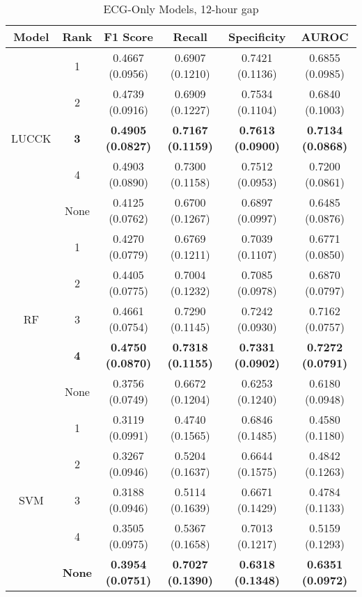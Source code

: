 \begin{table}
    \centering
    \caption{ECG-Only Models, 12-hour gap}
    \begin{tabular}{|c|c|c|c|c|c|}
        \hline
        Model & Rank & F1 Score & Recall & Specificity & AUROC \\
        \hline
         & 1 & 0.4667 (0.0956) & 0.6907 (0.1210) & 0.7421 (0.1136) & 0.6855 (0.0985)\\
         & 2 & 0.4739 (0.0916) & 0.6909 (0.1227) & 0.7534 (0.1104) & 0.6840 (0.1003)\\
        LUCCK & \textbf{3} & \textbf{0.4905 (0.0827)} & \textbf{0.7167 (0.1159)} & \textbf{0.7613 (0.0900)} & \textbf{0.7134 (0.0868)}\\
         & 4 & 0.4903 (0.0890) & 0.7300 (0.1158) & 0.7512 (0.0953) & 0.7200 (0.0861)\\
         & None & 0.4125 (0.0762) & 0.6700 (0.1267) & 0.6897 (0.0997) & 0.6485 (0.0876)\\
        \hline
        & 1 &  0.4270 (0.0779) & 0.6769 (0.1211) & 0.7039 (0.1107) & 0.6771 (0.0850)\\
         & 2 & 0.4405 (0.0775) & 0.7004 (0.1232) & 0.7085 (0.0978) & 0.6870 (0.0797)\\
        RF & 3 & 0.4661 (0.0754) & 0.7290 (0.1145) & 0.7242 (0.0930) & 0.7162 (0.0757)\\
         & \textbf{4} & \textbf{0.4750 (0.0870)} & \textbf{0.7318 (0.1155)} & \textbf{0.7331 (0.0902)} & \textbf{0.7272 (0.0791)}\\
         & None & 0.3756 (0.0749) & 0.6672 (0.1204) & 0.6253 (0.1240) & 0.6180 (0.0948)\\
         \hline
         & 1 & 0.3119 (0.0991) & 0.4740 (0.1565) & 0.6846 (0.1485) & 0.4580 (0.1180)\\
         & 2 & 0.3267 (0.0946) & 0.5204 (0.1637) & 0.6644 (0.1575) & 0.4842 (0.1263)\\
        SVM & 3 & 0.3188 (0.0946) & 0.5114 (0.1639) & 0.6671 (0.1429) & 0.4784 (0.1133)\\
         & 4 & 0.3505 (0.0975) & 0.5367 (0.1658) & 0.7013 (0.1217) & 0.5159 (0.1293)\\
         & \textbf{None} & \textbf{0.3954 (0.0751)} & \textbf{0.7027 (0.1390)} & \textbf{0.6318 (0.1348)} & \textbf{0.6351 (0.0972)}\\
        \hline
    \end{tabular}
\end{table}

